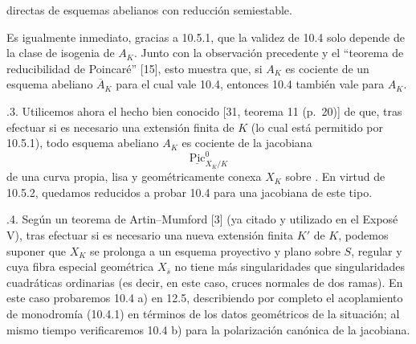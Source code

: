 
directas de esquemas abelianos con reducción semiestable.

Es igualmente inmediato, gracias a 10.5.1, que la validez de 10.4 solo
depende de la clase de isogenia de $A_K$. Junto con la observación
precedente y el ``teorema de reducibilidad de Poincaré'' [15], esto
muestra que, si $A_K$ es cociente de un esquema abeliano
$\overline A_K$ para el cual vale 10.4, entonces 10.4 también vale para
$A_K$.

\smallskip
{}.3. Utilicemos ahora el hecho bien conocido [31, teorema 11
(p.~20)] de que, tras efectuar si es necesario una extensión finita de
$K$ (lo cual está permitido por 10.5.1), todo esquema abeliano $A_K$ es
cociente de la jacobiana
\begin{equation*}
\underline{\operatorname{Pic}}^0_{X_K/K}
\end{equation*}
de una curva propia, lisa y geométricamente conexa $X_K$ sobre
. En virtud de 10.5.2, quedamos reducidos a probar 10.4
para una jacobiana de este tipo.

\smallskip
{}.4. Según un teorema de Artin--Mumford [3] (ya citado y utilizado
en el Exposé V), tras efectuar si es necesario una nueva extensión
finita $K'$ de $K$, podemos suponer que $X_K$ se prolonga a un esquema
proyectivo y plano sobre $S$, regular y cuya fibra especial geométrica
$X_{\bar s}$ no tiene más singularidades que singularidades cuadráticas
ordinarias (es decir, en este caso, cruces normales de dos ramas). En
este caso probaremos 10.4 a) en 12.5, describiendo por completo el
acoplamiento de monodromía (10.4.1) en términos de los datos geométricos
de la situación; al mismo tiempo verificaremos 10.4 b) para la
polarización canónica de la jacobiana.


